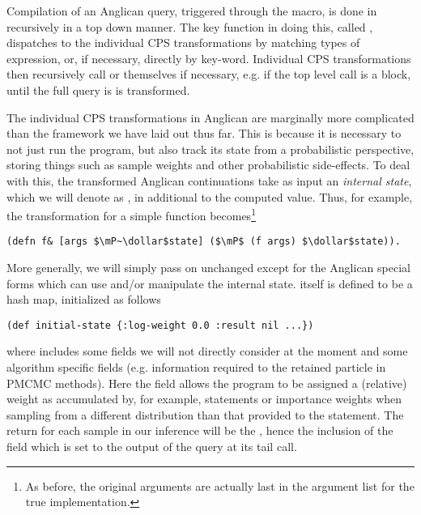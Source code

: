 Compilation of an Anglican query, triggered through the \query macro, is done in recursively
in a top down manner.  The key function in doing this, called ,
dispatches to the individual CPS transformations by matching types of expression, or, if necessary,
directly by key-word.  Individual CPS transformations then recursively call 
or themselves if necessary, e.g. if the top level call is a  block, until the full query is
is transformed.  

The individual CPS transformations in Anglican are marginally more complicated than the
framework we have laid out thus far.  This is because it is necessary to not just run the
program, but also track its state from a probabilistic perspective, storing things such
as sample weights and other probabilistic side-effects.  To deal with this, the transformed Anglican
continuations take as input an \emph{internal state}, which we will denote as \angstate,
in additional to the computed value.
Thus, for example, the transformation for a simple function becomes\footnote{As before, the original arguments
	are actually last in the argument list for the true implementation.}
\begin{lstlisting}[basicstyle=\ttfamily\small,frame=none]
  (defn f& [args $\mP~\dollar$state] ($\mP$ (f args) $\dollar$state)).
\end{lstlisting}\vspace{-8pt}
More generally, we will simply pass on \angstate unchanged except for the Anglican
special forms which can use and/or manipulate the internal state.  \angstate itself
is defined to be a hash map, initialized as follows
\begin{lstlisting}[basicstyle=\ttfamily\small,frame=none]
  (def initial-state {:log-weight 0.0 :result nil ...})
\end{lstlisting}\vspace{-8pt}
where  includes some fields we will not directly consider at the moment and some algorithm
specific fields (e.g. information required to the retained particle in PMCMC methods).
Here the field  allows the program to be assigned a
(relative) weight as accumulated by, for example, \observe statements or importance weights
when sampling from a different distribution than that provided to the \sample statement.
The return for each sample in our inference will be the \angstate, hence the inclusion
of the  field which is set to the output of the query at its tail call.

